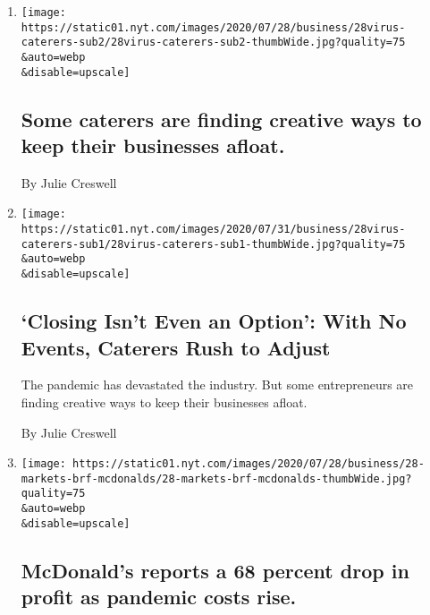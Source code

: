 \begin{enumerate}
\def\labelenumi{\arabic{enumi}.}
\item
  \href{/live/2020/08/04/business/stock-market-today-coronavirus/some-caterers-are-finding-creative-ways-to-keep-their-businesses-afloat}{}

  \texttt{[image: https://static01.nyt.com/images/2020/07/28/business/28virus-caterers-sub2/28virus-caterers-sub2-thumbWide.jpg?quality=75\\\&auto=webp\\\&disable=upscale]}

  \hypertarget{some-caterers-are-finding-creative-ways-to-keep-their-businesses-afloat}{%
  \subsection{Some caterers are finding creative ways to keep their
  businesses
  afloat.}\label{some-caterers-are-finding-creative-ways-to-keep-their-businesses-afloat}}

  By Julie Creswell
\item
  \href{/2020/08/04/business/coronavirus-struggling-caterers.html}{}

  \texttt{[image: https://static01.nyt.com/images/2020/07/31/business/28virus-caterers-sub1/28virus-caterers-sub1-thumbWide.jpg?quality=75\\\&auto=webp\\\&disable=upscale]}

  \hypertarget{closing-isnt-even-an-option-with-no-events-caterers-rush-to-adjust}{%
  \subsection{`Closing Isn't Even an Option': With No Events, Caterers
  Rush to
  Adjust}\label{closing-isnt-even-an-option-with-no-events-caterers-rush-to-adjust}}

  The pandemic has devastated the industry. But some entrepreneurs are
  finding creative ways to keep their businesses afloat.

  By Julie Creswell
\item
  \href{/live/2020/07/28/business/stock-market-today-coronavirus/mcdonalds-reports-a-68-percent-drop-in-profit-as-pandemic-costs-rise}{}

  \texttt{[image: https://static01.nyt.com/images/2020/07/28/business/28-markets-brf-mcdonalds/28-markets-brf-mcdonalds-thumbWide.jpg?quality=75\\\&auto=webp\\\&disable=upscale]}

  \hypertarget{mcdonalds-reports-a-68-percent-drop-in-profit-as-pandemic-costs-rise}{%
  \subsection{McDonald's reports a 68 percent drop in profit as pandemic
  costs
  rise.}\label{mcdonalds-reports-a-68-percent-drop-in-profit-as-pandemic-costs-rise}}


\end{enumerate}
